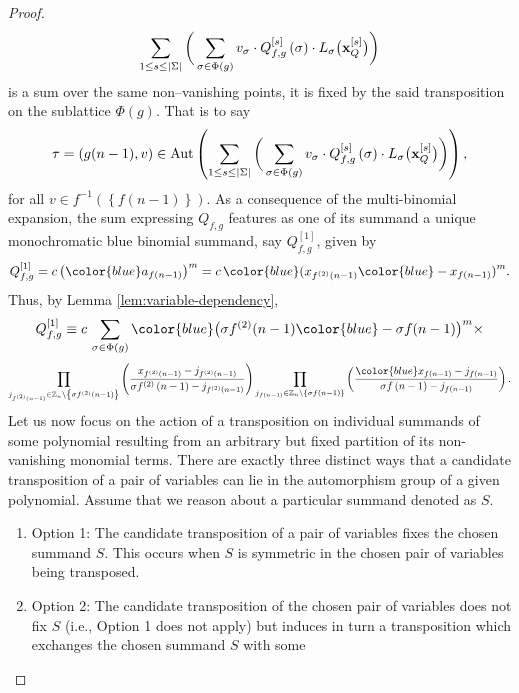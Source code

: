 \begin{proof}
\[
 \sum_{1\leq s\leq\left|\Sigma\right|}\bigg(\sum_{\sigma\in\Phi(g)}v_{\sigma}\cdot Q_{f,g}^{\left[s\right]}\left(\sigma\right)\cdot L_{\sigma}\big({\bf x}_{Q}^{\left[s\right]}\big)\bigg)
\]
is a sum over the same non--vanishing points, it is fixed by the said transposition on the sublattice $\Phi(g)$. That is to say
\[
\tau=\left(g(n-1),v\right)\in\text{Aut}\left(\sum_{1\leq s\leq\left|\Sigma\right|}\bigg(\sum_{\sigma\in\Phi(g)}v_{\sigma}\cdot Q_{f,g}^{\left[s\right]}\left(\sigma\right)\cdot L_{\sigma}\big({\bf x}_{Q}^{\left[s\right]}\big)\bigg)\right),
\]
for all $v\in f^{-1}\left(\left\{ f\left(n-1\right)\right\} \right)$.
As a consequence of the multi-binomial expansion, the sum expressing
$Q_{f,g}$ features as one of its summand a unique monochromatic blue binomial summand, say $Q_{f,g}^{\left[1\right]}$, given by
\[
Q_{f,g}^{\left[1\right]}=c\left({\color{blue}a_{f\left(n-1\right)}}\right)^{m}=c\,{\color{blue}(}x_{f^{\left(2\right)}\left(n-1\right)}{\color{blue}-x_{f\left(n-1\right)})}^{m}.
\] 
Thus, by Lemma \ref{lem:variable-dependency},
\[
Q_{f,g}^{\left[1\right]}\equiv c\,\sum_{\sigma\in\Phi(g)}{\color{blue}\big(}\sigma f^{(2)}(n-1){\color{blue}-\sigma f(n-1)\big)}^{m}\times
\]
\[
\prod_{j_{f^{(2)}\left(n-1\right)}\in\mathbb{Z}_{n}\backslash\left\{ \sigma f^{(2)}\left(n-1\right)\right\} }\left(\frac{x_{f^{(2)}\left(n-1\right)}-j_{f^{(2)}\left(n-1\right)}}{\sigma f^{(2)}\left(n-1\right)-j_{f^{(2)}\left(n-1\right)}}\right)\prod_{j_{f\left(n-1\right)}\in\mathbb{Z}_{n}\backslash\left\{ \sigma f\left(n-1\right)\right\} }\left(\frac{{\color{blue}x_{f\left(n-1\right)}}-j_{f\left(n-1\right)}}{\sigma f\left(n-1\right)-j_{f\left(n-1\right)}}\right).
\]
Let us now focus on the action of a transposition
on individual summands of some polynomial resulting from an arbitrary but fixed partition
of its non-vanishing monomial terms. There are exactly three distinct ways that a candidate
transposition of a pair of variables can lie in the automorphism group of a
given polynomial.  Assume that we reason about
a particular summand denoted as $S$.
\begin{enumerate}
\item Option 1: The candidate transposition of a pair of variables fixes
the chosen summand $S$. This occurs when $S$ is symmetric in the
chosen pair of variables being transposed.
\item Option 2: The candidate transposition of the chosen pair of variables
does not fix $S$ (i.e., Option 1 does not apply) but induces in turn
a transposition which exchanges the chosen summand $S$ with some

\end{enumerate}
\end{proof}
